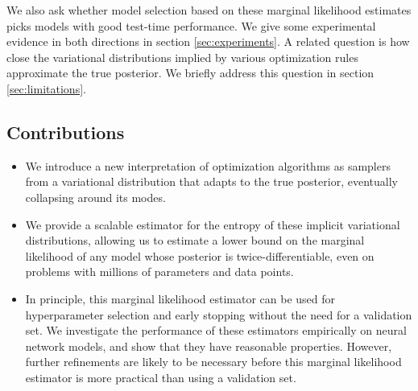 \documentclass[]{article}
\begin{document}
We also ask whether model selection based on these marginal likelihood estimates picks models with good test-time performance.
We give some experimental evidence in both directions in section \ref{sec:experiments}.
A related question is how close the variational distributions implied by various optimization rules approximate the true posterior.
We briefly address this question in section \ref{sec:limitations}.

\subsection{Contributions}
\begin{itemize}
\item We introduce a new interpretation of optimization algorithms as samplers from a variational distribution that adapts to the true posterior, eventually collapsing around its modes.
\item We provide a scalable estimator for the entropy of these implicit variational distributions, allowing us to estimate a lower bound on the marginal likelihood of any model whose posterior is twice-differentiable, even on problems with millions of parameters and data points.
\item In principle, this marginal likelihood estimator can be used for hyperparameter selection and early stopping without the need for a validation set.
We investigate the performance of these estimators empirically on neural network models, and show that they have reasonable properties.
However, further refinements are likely to be necessary before this marginal likelihood estimator is more practical than using a validation set.
\end{itemize}
\end{document}
